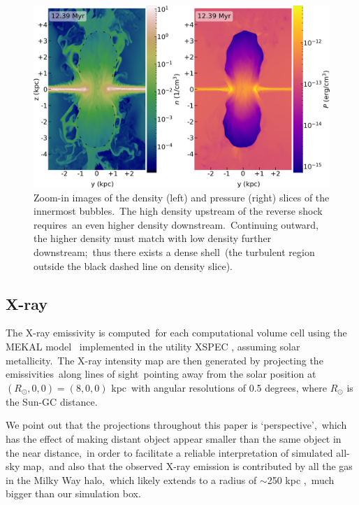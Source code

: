 \documentclass[fleqn,usenatbib,useAMS]{mnras}
\begin{document}
  \begin{figure}
    \includegraphics[width=\columnwidth]{figures/fig__innerbubbles.png}
    \caption{
       Zoom-in images of the density (left) and pressure (right) slices of the innermost bubbles.\
       The high density upstream of the reverse shock requires\
       an even higher density downstream.\
       Continuing outward, the higher density must match with low density further downstream;\
       thus there exists a dense shell\
       (the turbulent region outside the black dashed line on density slice).
     }
    \label{fig__innerbubbles}
  \end{figure}

  \subsection{X-ray}
  \label{X-ray}
  The X-ray emissivity is computed\
  for each computational volume cell
  using the MEKAL model \citep{Xray-1,Xray-2,Xray-3}\
  implemented in the utility XSPEC \citep{XSPEC}, assuming solar metallicity.\
  The X-ray intensity map are then generated by projecting the emissivities\
  along lines of sight\
  pointing away from the solar position at $(R_{\odot},0,0)=(8,0,0)$ kpc\
  with angular resolutions of 0.5 degrees, where $R_{\odot}$ is the Sun-GC distance.

  We point out that the projections throughout this paper is \lq perspective\rq,\
  which has the effect of making distant object appear smaller than the same object in the near distance,\
  in order to facilitate a reliable interpretation of simulated all-sky map,\
  and also that the observed X-ray emission is contributed by all the gas in the Milky Way halo,\
  which likely extends to a radius of $\sim$250 kpc \citep{halo-radius-1,halo-radius-2},\
  much bigger than our simulation box.
\end{document}
